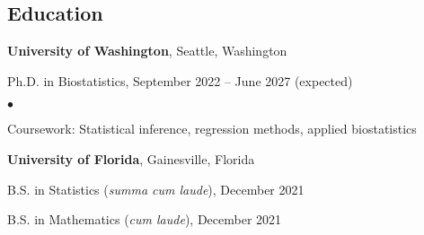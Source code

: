 \documentclass[margin,centered]{res}
\newenvironment{list1}{
  \begin{list}{\ding{113}}{%
      \setlength{\itemsep}{0in}
      \setlength{\parsep}{0in} \setlength{\parskip}{0in}
      \setlength{\topsep}{0in} \setlength{\partopsep}{0in}
      \setlength{\leftmargin}{0.17in}}}{\end{list}}
\newenvironment{list2}{
  \begin{list}{$\bullet$}{%
      \setlength{\itemsep}{0in}
      \setlength{\parsep}{0in} \setlength{\parskip}{0in}
      \setlength{\topsep}{0in} \setlength{\partopsep}{0in}
      \setlength{\leftmargin}{0.2in}}}{\end{list}}
\begin{document}
\begin{resume}











\section{\sc Education}
{\bf University of Washington}, Seattle, Washington
\begin{list1}
\item[] 
Ph.D. in Biostatistics, September 2022 -- June 2027 (expected)
\begin{list2}
\vspace*{.05in}
\item Coursework: Statistical inference, regression methods, applied biostatistics
\end{list2}
\end{list1}



{\bf University of Florida}, Gainesville, Florida
\begin{list1}
\item[] B.S. in Statistics (\textit{summa cum laude}), December 2021
\item[] B.S. in Mathematics (\textit{cum laude}), December 2021
\end{list1}



\end{resume}
\end{document}
